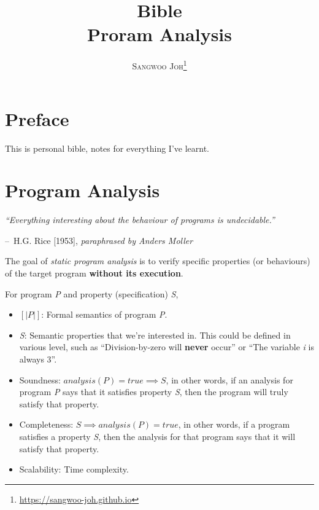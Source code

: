 \documentclass[12pt, twopage]{book}
\title{
  \Huge \textbf{Bible}
  \\
  \huge {Proram Analysis}
}
\author{\textsc{Sangwoo Joh}\footnote{\url{https://sangwoo-joh.github.io}}}
\makeatletter
\newenvironment{chapquote}[2][2em]
  {\setlength{\@tempdima}{#1}%
   \def\chapquote@author{#2}%
   \parshape 1 \@tempdima \dimexpr\textwidth-2\@tempdima\relax%
   \itshape}
  {\par\normalfont\hfill--\ \chapquote@author\hspace*{\@tempdima}\par\bigskip}
\makeatother
\begin{document}
\frontmatter
\maketitle

\tableofcontents  %

\mainmatter


\chapter*{Preface}
This is personal bible, notes for everything I've learnt.


\chapter{Program Analysis}
\begin{chapquote}{H.G. Rice [1953], \textit{paraphrased by Anders Moller}}
  ``Everything interesting about the behaviour of programs is
  undecidable.''
\end{chapquote}

The goal of \textit{static program analysis} is to verify specific
properties (or behaviours) of the target program \textbf{without its
  execution}.

For program \textsl{P} and property (specification) \textsl{S},

\begin{itemize}
\item $ [|P|] $: Formal semantics of program \textsl{P}.

\item \textsl{S}: Semantic properties that we're interested in. This
  could be defined in various level, such as ``Division-by-zero will
  \textbf{never} occur'' or ``The variable \textit{i} is always 3''.

\item Soundness: $ analysis(P) = true \implies S $, in other words, if
  an analysis for program \textsl{P} says that it satisfies property
  \textsl{S}, then the program will truly satisfy that property.

\item Completeness: $ S \implies analysis(P) = true $, in other words,
  if a program satisfies a property \textsl{S}, then the analysis for
  that program says that it will satisfy that property.

\item Scalability: Time complexity.
\end{itemize}
\end{document}
